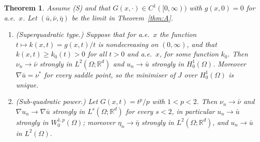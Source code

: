 \documentclass[11pt]{amsart}
\newtheorem{maintheorem}{Theorem}
\theoremstyle{definition}
\theoremstyle{remark}
\numberwithin{equation}{section}
\newcommand{\R}{\mathbb{R}}
\begin{document}
\begin{maintheorem}\label{thm:B}
Assume (S) and that $G(x,\cdot)\in C^1([0,\infty))$ with $g(x,0)=0$ for a.e.\ $x$. Let $(\bar u,\bar\nu,\bar\eta)$ be the limit in Theorem~\ref{thm:A}.
\begin{enumerate}[label=\textup{(\alph*)}]
\item \textup{(Superquadratic type.)} Suppose that for a.e.\ $x$ the function $t\mapsto k(x,t)=g(x,t)/t$ is nondecreasing on $(0,\infty)$, and that $k(x,t)\ge k_0(t)>0$ for all $t>0$ and a.e.\ $x$, for some function $k_0$. Then $\nu_n\to\bar\nu$ strongly in $L^2(\Omega;\R^d)$ and $u_n\to\bar u$ strongly in $H^1_0(\Omega)$. Moreover $\nabla\bar u=\nu^*$ for every saddle point, so the minimiser of $J$ over $H^1_0(\Omega)$ is unique.
\item \textup{(Sub-quadratic power.)} Let $G(x,t)=t^p/p$ with $1<p<2$. Then $\nu_n\to\bar\nu$ and $\nabla u_n\to\nabla\bar u$ strongly in $L^s(\Omega;\R^d)$ for every $s<2$, in particular $u_n\to\bar u$ strongly in $W^{1,p}_0(\Omega)$; moreover $\eta_n\to\bar\eta$ strongly in $L^2(\Omega;\R^d)$, and $u_n\to\bar u$ in $L^2(\Omega)$.
\end{enumerate}
\end{maintheorem}
\end{document}
